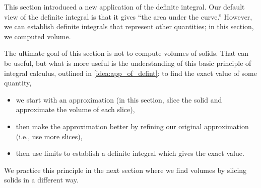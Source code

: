 
This section introduced a new application of the definite integral. Our default view of the definite integral is that it gives ``the area under the curve.'' However, we can establish definite integrals that represent other quantities; in this section, we computed volume.

The ultimate goal of this section is not to compute volumes of solids. That can be useful, but what is more useful is the understanding of this basic principle of integral calculus, outlined in \autoref{idea:app_of_defint}: to find the exact value of some quantity, 
\begin{itemize}
	\item we start with an approximation (in this section, slice the solid and approximate the volume of each slice), 
	\item then make the approximation better by refining our original approximation (i.e., use more slices), 
	\item	then use limits to establish a definite integral which gives the exact value.
\end{itemize}

We practice this principle in the next section where we find volumes by slicing solids in a different way.

